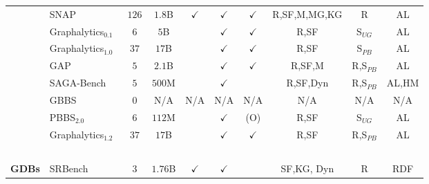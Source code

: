 \begin{landscape}
\begin{table}[htbp]
\begin{tabular}{ll|cccccccc}
               {\footnotesize ~              }  & {\footnotesize SNAP~\cite{Leskovec2016}                }      &  $126$    &    $1.8$B    & $\checkmark$  & $\checkmark$  & $\checkmark$  & R,SF,M,MG,KG  &  R            &  AL           \\
               {\footnotesize ~              }  & {\footnotesize Graphalytics$_{0.1}$~\cite{Capota2015}  }      &  $6$      &     $5$B     &               & $\checkmark$  & $\checkmark$  & R,SF          & S$_{UG}$      &  AL           \\
               {\footnotesize ~              }  & {\footnotesize Graphalytics$_{1.0}$~\cite{Iosup2016}   }      &  $37$     &    $17$B     &               & $\checkmark$  & $\checkmark$  & R,SF          & S$_{PB}$      &  AL           \\
               {\footnotesize ~              }  & {\footnotesize GAP~\cite{Beamer2017}                   }      &  $5$      &    $2.1$B    &               & $\checkmark$  & $\checkmark$  & R,SF,M        & R,S$_{PB}$    &  AL           \\
               {\footnotesize ~              }  & {\footnotesize SAGA-Bench~\cite{Basak2020}             }      &  $5$      &    $500$M    &               & $\checkmark$  &               & R,SF,Dyn      & R,S$_{PB}$    &  AL,HM        \\
               {\footnotesize ~              }  & {\footnotesize GBBS~\cite{Dhulipala2020,Dhulipala2021} }      &  $0$      &      N/A     &     N/A       &     N/A       &    N/A        &      N/A      &     N/A       &  N/A          \\
               {\footnotesize ~              }  & {\footnotesize PBBS$_{2.0}$~\cite{Anderson2022}        }      &  $6$      &    $112$M    &               & $\checkmark$  &     (O)       & R,SF          & S$_{UG}$      &  AL           \\
               {\footnotesize ~              }  & {\footnotesize Graphalytics$_{1.2}$~\cite{Iosup2023}   }      &  $37$     &    $17$B     &               & $\checkmark$  & $\checkmark$  & R,SF          & R,S$_{PB}$    &  AL           \\
               {\footnotesize ~              }  & {\footnotesize ~                                       }      &           &       ~      &       ~       &       ~       &       ~       &       ~       &       ~       &      ~        \\
               {\footnotesize \textbf{GDBs}  }  & {\footnotesize SRBench~\cite{Zhang2012}                }      &  $3$      &    $1.76$B   & $\checkmark$  & $\checkmark$  &               & SF,KG, Dyn    & R             &  RDF          \\

\end{tabular}
\end{table}
\end{landscape}
